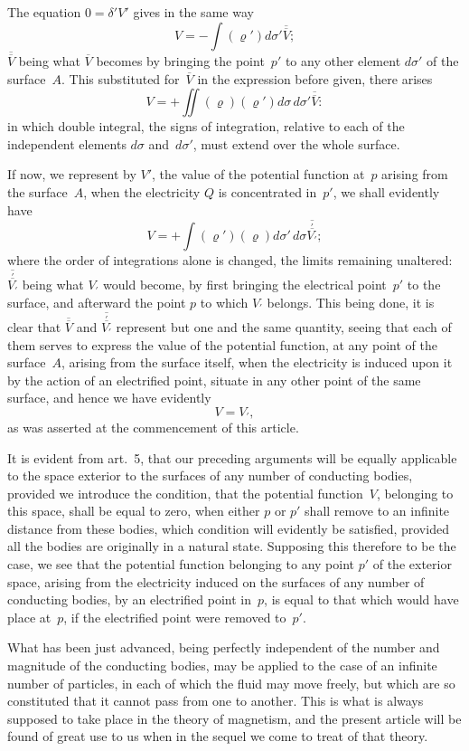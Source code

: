 \documentclass[11pt,notitlepage]{amsart}
\renewcommand{\rho}{\varrho}
\begin{document}
The equation $0=\delta'V'$ gives in the same way
\[
V=-\int(\rho')d\sigma'\overline{\overline{V}};
\]
$\overline{\overline{V}}$ being what $\overline{V}$ becomes
by bringing the point~$p'$ to any other element $d\sigma'$
of the surface~$A$. This substituted for~$\overline{V}$
in the expression before given,
there arises
\[
V=+\iint(\rho)(\rho')d\sigma\,d\sigma'\overline{\overline{V}}:
\]
in which double integral, the signs of integration, relative to each of the 
independent elements $d\sigma$ and~$d\sigma'$,
must extend over the whole surface.

If now, we represent by $V'$, the value of the potential function at~$p$
arising from the surface~$A$,
when the electricity $Q$ is concentrated in~$p'$, we
shall evidently have
\[
V=+\int(\rho')(\rho)d\sigma'\,
d\sigma\overline{\stackrel\prime{\overline{V_\prime}}};
\]
where the order of integrations alone is changed,
the limits remaining unaltered:
$\overline{\stackrel\prime{\overline{V_\prime}}}$ being
what $V_\prime$ would become, by first bringing the electrical point~$p'$ to
the surface, and afterward the point $p$ to which $V_\prime$ belongs.
This being done,
it is clear that $\overline{\overline{V}}$ and
$\overline{\stackrel\prime{\overline{V_\prime}}}$
represent but one and the same quantity, seeing
that each of them serves to express the value of the potential function, at
any point of the surface~$A$,
arising from the surface itself, when the electricity
is induced upon it by the action of an electrified point, situate in any other
point of the same surface, and hence we have evidently
\[
V=V_\prime,
\]
as was asserted at the commencement of this article.

It is evident from art.~5, that our preceding arguments will be equally
applicable to the space exterior to the surfaces of any number of conducting
bodies, provided we introduce the condition, that the potential function~$V$,
belonging to this space, shall be equal to zero, when either $p$ or $p'$ shall
remove to an infinite distance from these bodies, which condition will 
evidently be satisfied,
provided all the bodies are originally in a natural state.
Supposing this therefore to be the case, we see that the potential function
belonging to any point $p'$ of the exterior space, arising from the electricity
induced on the surfaces of any number of conducting bodies, by an electrified
point in~$p$, is equal to that which would have place at~$p$, if the electrified
point were removed to~$p'$.

What has been just advanced, being perfectly independent of the number
and magnitude of the conducting bodies, may be applied to the case of an 
infinite number of particles, in each of which the fluid may move freely, but
which are so constituted that it cannot pass from one to another. This is
what is always supposed to take place in the theory of magnetism, and the
present article will be found of great use to us when in the sequel we come
to treat of that theory.
\bigskip
\end{document}
